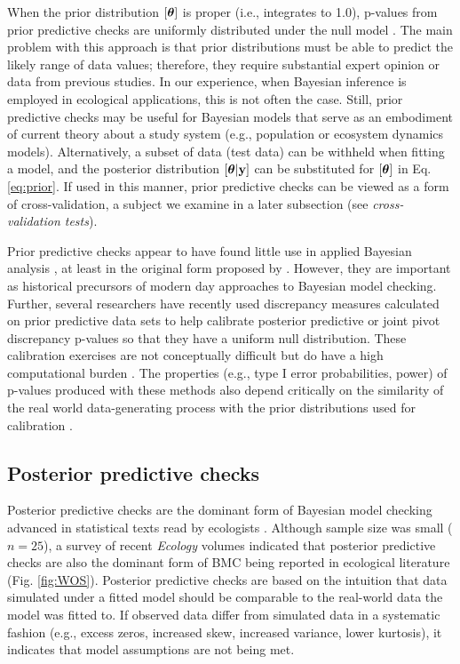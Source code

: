 \documentclass[12pt,english]{article}
\begin{document}
\begin{spacing}{1.9}
When the prior distribution $[\boldsymbol{\theta}]$ is proper (i.e., integrates
to 1.0), p-values from prior predictive checks are uniformly
distributed under the null model \citep{BayarriBerger2000}.  The main
problem with this approach is that prior distributions must be able to
predict the likely range of data values; therefore, they require
substantial expert opinion or data from previous studies.  In our
experience, when Bayesian inference is employed in ecological
applications, this is not often the case.  Still, prior predictive
checks may be useful for Bayesian models that serve as an
embodiment of current theory about a study system (e.g., population or
ecosystem dynamics models).  Alternatively, a subset of data (test
data) can be withheld when fitting a model, and the posterior
distribution $[\boldsymbol{\theta}|{\bf y}]$ can be substituted for $[\boldsymbol{\theta}]$ in
Eq. \ref{eq:prior}.  If used in this manner, prior predictive checks
can be viewed as a form of cross-validation, a subject we examine in a
later subsection (see \textit{cross-validation tests}).

Prior predictive checks appear to have found little use in applied
Bayesian analysis \citep[but see][]{DeyEtAl1998}, at least in the
original form proposed by \citet{Box1980}. However, they are important
as historical precursors of modern day approaches to Bayesian model
checking. Further, several researchers have recently used discrepancy
measures calculated on prior predictive data sets to help calibrate
posterior predictive \citep[e.g.,][]{HjortEtAl2006} or joint pivot
discrepancy \citep{Johnson2007} p-values so that they have a uniform
null distribution.  These calibration exercises are not conceptually
difficult but do have a high computational burden
\citep{YuanJohnson2012}. The properties (e.g., type I error
probabilities, power) of p-values produced with these methods also
depend critically on the similarity of the real world data-generating
process with the prior distributions used for calibration
\citep{Zhang2014}.

\subsection{Posterior predictive checks}

Posterior predictive checks are the dominant form of Bayesian model
checking advanced in statistical texts read by ecologists
\citep[e.g.,][]{KingEtAl2009,LinkBarker2010,KerySchaub2012,GelmanEtAl2014}. Although
sample size was small ($n=25$), a survey of recent \textit{Ecology}
volumes indicated that posterior predictive checks are also the
dominant form of BMC being reported in ecological literature
(Fig. \ref{fig:WOS}).  Posterior predictive checks are based on the
intuition that data simulated under a fitted model should be
comparable to the real-world data the model was fitted to. If observed
data differ from simulated data in a systematic fashion (e.g., excess
zeros, increased skew, increased variance, lower kurtosis), it
indicates that model assumptions are not being met.


\end{spacing}
\end{document}
